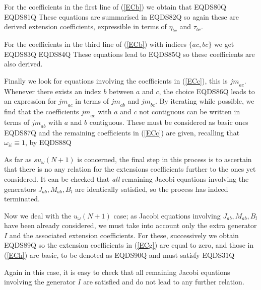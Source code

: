 \documentclass[12pt]{article}
\begin{document}
For the coefficients in the first line of (\ref{ECb}) we obtain that
EQDS80Q
EQDS81Q
These equations are summarised in
EQDS82Q
so again these are derived extension coefficients, expressible in
terms of ${\eta}_{bc}$ and ${\tau}_{bc}$.

For the coefficients in the third line of (\ref{ECb}) with indices
$\{ac,bc\}$ we get
EQDS83Q
EQDS84Q
These equations lead to
EQDS85Q
so these coefficients are also derived.

Finally we look for equations involving the coefficients in
(\ref{ECc}), this is ${jm}_{ac}$. Whenever there exists an index
$b$ between $a$ and $c$, the choice
EQDS86Q
leads to an expression for ${jm}_{ac}$ in terms of ${jm}_{ab}$ and
${jm}_{bc}$. By iterating while possible, we find that the
coefficients   ${jm}_{ac}$ with $a$ and $c$ not contiguous can be
written in terms of ${jm}_{ab}$ with $a$ and $b$ contiguous. These
must be considered as basic ones
EQDS87Q
and the remaining coefficients in (\ref{ECc}) are given, recalling that
${\omega}_{ii}\equiv 1$, by
EQDS88Q

As far as $su_{\omega}(N+1)$ is concerned, the final step in this
process is to ascertain that there is no  any relation for the
extensions coefficients further to the ones yet considered. It can
be checked that \emph{all} remaining Jacobi equations
involving the generators ${J}_{ab}, {M}_{ab}, {B}_l$ are
identically satisfied, so the process has indeed terminated.

Now we deal with the $u_{\omega}(N+1)$ case; as Jacobi equations
involving ${J}_{ab}, {M}_{ab}, {B}_l$ have been already considered,
we must take into account only the extra generator ${I}$ and the
associated extension coefficients. For these, successively we obtain
EQDS89Q
so the extension coefficients in (\ref{ECg}) are equal to zero,  and those in
(\ref{ECh}) are basic, to be denoted as
EQDS90Q
and must satisfy
EQDS31Q

Again in this case, it is easy to check that all  remaining Jacobi
equations involving the generator ${I}$ are satisfied and  do not lead
to any further relation.
\end{document}
